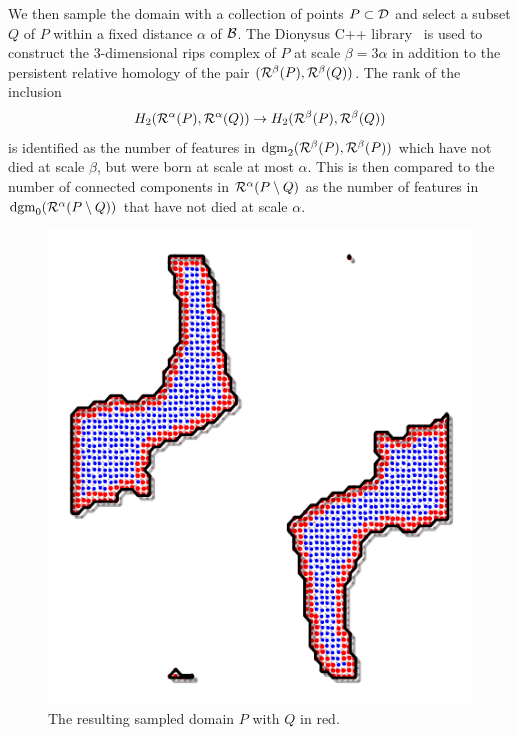We then sample the domain with a collection of points $P\subset{\mathcal{D}}$ and select a subset $Q$ of $P$ within a fixed distance $\alpha$ of ${\mathcal{B}}$.
The Dionysus C++ library~\cite{dionysus2} is used to construct the 3-dimensional rips complex of $P$ at scale $\beta = 3\alpha$ in addition to the persistent relative homology of the pair $(\mathcal{R}^\beta(P), \mathcal{R}^\beta(Q))$.
The rank of the inclusion \[H_2(\mathcal{R}^\alpha(P), \mathcal{R}^\alpha(Q))\to H_2(\mathcal{R}^\beta(P), \mathcal{R}^\beta(Q))\] is identified as the number of features in $\mathrm{dgm}_2(\mathcal{R}^\beta(P), \mathcal{R}^\beta(P))$ which have not died at scale $\beta$, but were born at scale at most $\alpha$.
This is then compared to the number of connected components in $\mathcal{R}^\alpha(P\setminus Q)$ as the number of features in $\mathrm{dgm}_0(\mathcal{R}^\alpha(P\setminus Q))$ that have not died at scale $\alpha$.

\begin{figure}[htbp]
\centering
    \includegraphics[scale=1.]{figures/hsn_domain_2.pdf}
    \caption{The resulting sampled domain $P$ with $Q$ in red.}
    \label{fig:hsn_domain}
\end{figure}

